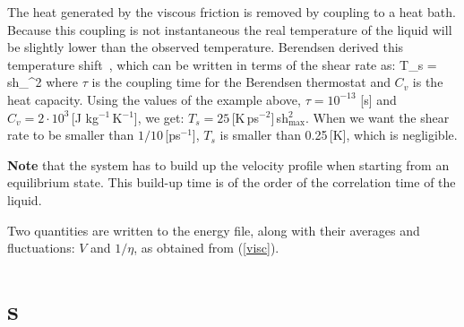 The heat generated by the viscous friction is removed by coupling to a heat
bath. Because this coupling is not instantaneous the real temperature of the
liquid will be slightly lower than the observed temperature.
Berendsen derived this temperature shift~\cite{Berendsen91}, which can
be written in terms of the shear rate as:
\beq
T_s =  \mbox{sh}_{\max}^2
\eeq
where $\tau$ is the coupling time for the Berendsen thermostat and
$C_v$ is the heat capacity. Using the values of the example above,
$\tau=10^{-13}$ [s] and $C_v=2 \cdot 10^3$\,[J kg$^{-1}$\,K$^{-1}$], we
get: $T_s=25$\,[K\,ps$^{-2}$]\,sh$_{\max}^2$. When we want the shear
rate to be smaller than $1/10$\,[ps$^{-1}$], $T_s$ is smaller than
0.25\,[K], which is negligible.

{\bf Note} that the system has to build up the velocity profile when starting
from an equilibrium state. This build-up time is of the order of the
correlation time of the liquid.

Two quantities are written to the energy file, along with their averages
and fluctuations: $V$ and $1/\eta$, as obtained from (\ref{visc}).

\section{s}
